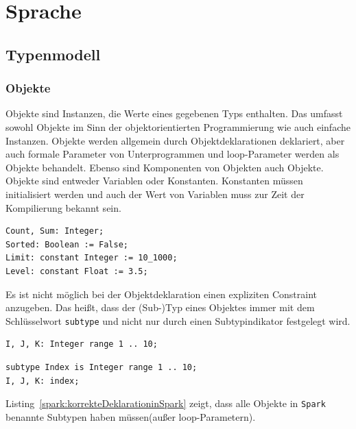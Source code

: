 \section{Sprache}

\subsection{Typenmodell}
\label{subsec:Typenmodell}
\subsubsection{Objekte}
\label{subsubsec:Objekte}
Objekte sind Instanzen, die Werte eines gegebenen Typs enthalten. Das umfasst sowohl Objekte im Sinn der objektorientierten Programmierung wie auch einfache Instanzen. Objekte werden allgemein durch Objektdeklarationen deklariert, aber auch formale Parameter von Unterprogrammen und loop-Parameter werden als Objekte behandelt. Ebenso sind Komponenten von Objekten auch Objekte.\\
Objekte sind entweder Variablen oder Konstanten. Konstanten müssen initialisiert werden und auch der Wert von Variablen muss zur Zeit der Kompilierung bekannt sein.\\
\begin{lstlisting}[caption={Beispiele für einfache Objekte in Spark}, label=spark:einfacheObjekte]
Count, Sum: Integer;
Sorted: Boolean := False;
Limit: constant Integer := 10_1000;
Level: constant Float := 3.5;
\end{lstlisting}


Es ist nicht möglich bei der Objektdeklaration einen expliziten Constraint anzugeben. Das heißt, dass der (Sub-)Typ eines Objektes immer mit dem Schlüsselwort \texttt{subtype} und nicht nur durch einen Subtypindikator festgelegt wird.

\begin{lstlisting}[caption={Deklaration gültig in Ada, aber unzulässig in Spark}, label=ada:falscheDeklarationinAda]
I, J, K: Integer range 1 .. 10;
\end{lstlisting}

\begin{lstlisting}[caption={korrekte Deklaration in Spark}, label=spark:korrekteDeklarationinSpark]
subtype Index is Integer range 1 .. 10;
I, J, K: index;
\end{lstlisting}


Listing~\ref{spark:korrekteDeklarationinSpark} zeigt, dass alle Objekte in \texttt{Spark} benannte Subtypen haben müssen(außer loop-Parametern).

